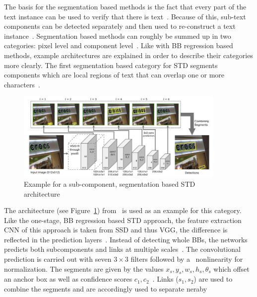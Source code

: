The basis for the segmentation based methods is the fact that every part of the text instance can
be used to verify that there is text~\citep{long_scene_2021}.
Because of this, sub-text components can be detected separately and then used to re-construct a text
instance~\citep{long_scene_2021}.
Segmentation based methods can roughly be summed up in two categories: pixel level and component
level~\citep{long_scene_2021}.
Like with \ac{BB} regression based methods, example architectures are explained in order to
describe their categories more clearly.
The first segmentation based category for \ac{STD} segments components which are local regions of
text that can overlap one or more characters~\citep{long_scene_2021}.
\begin{figure}[ht]
    \centering
    \includegraphics[width=0.9\textwidth]{img/STD-seg-based-architecture-Shi-Detecting-2017.png}
    \caption[Sub-component, segmentation based STD architecture]{%
        Example for a sub-component, segmentation based STD
        architecture~\citep{shi_detecting_2017}\label{fig:STD-segbased-component-architecture}
    }
\end{figure}
The architecture (see Figure~\ref{fig:STD-segbased-component-architecture})
from~\cite{shi_detecting_2017} is used as an example for this category.
Like the one-stage, \ac{BB} regression based \ac{STD} approach, the feature extraction \ac{CNN} of
this approach is taken from \ac{SSD} and thus VGG, the difference is reflected in the prediction
layers~\citep{shi_detecting_2017,liu_ssd_2016,simonyan_very_2015}.
Instead of detecting whole \acp{BB}, the networks predicts both subcomponents and links at multiple
scales~\citep{shi_detecting_2017}.
The convolutional prediction is carried out with seven $3\times3$ filters followed by a \sfmx\
nonlinearity for normalization.
The segments are given by the values $x_s,y_s,w_s,h_s,\theta_s$ which offset an anchor box as well
as confidence scores $c_1,c_2$~\citep{shi_detecting_2017}.
Links ($s_1,s_2$) are used to combine the segments and are accordingly used to separate neraby
